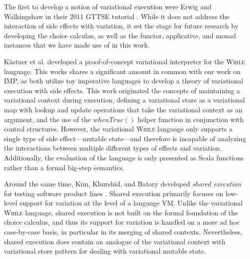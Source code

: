 \documentclass[12pt,oneside]{book}
\begin{document}
The first to develop a notion of variational execution were Erwig and Walkingshaw in their 2011 GTTSE tutorial \cite{EW11gttse}.
While it does not address the interaction of side effects with variation, it set the stage for future research by developing the choice calculus,
as well as the functor, applicative, and monad instances that we have made use of in this work.

 K\"astner et al. \cite{varwhile} developed a proof-of-concept variational interpreter for the \textsc{While} language. This works shares a
 significant amount in common with our work on IMP, as both utilize toy imperative languages to develop a theory of variational execution
 with side effects. This work originated the concepts of maintaining a variational context during execution, defining a variational store as
 a variational map with lookup and update operations that take the variational context as an argument, and the use of the $\mathit{whenTrue}()$
 helper function in conjunction with control structures. However, the variational \textsc{While} language only supports a single type of side
 effect---mutable state---and therefore is incapable of analyzing the interactions between multiple different types of effects and variation.
 Additionally, the evaluation of the language is only presented as Scala functions rather than a formal big-step semantics.
 
 Around the same time, Kim, Khurshid, and Batory developed \emph{shared execution} for testing software product lines \cite{sharedexec}.
 Shared execution primarily focuses on low-level support for variation at the level of a language VM.
 Unlike the variational \textsc{While} language, shared execution is not built on the formal foundation of the choice calculus, and thus its
 support for variation is handled on a more ad hoc case-by-case basis, in particular in its merging of shared contexts. Nevertheless,
 shared execution does contain an analogue of the variational context with variational store pattern for dealing with variational mutable state.
 
\end{document}
